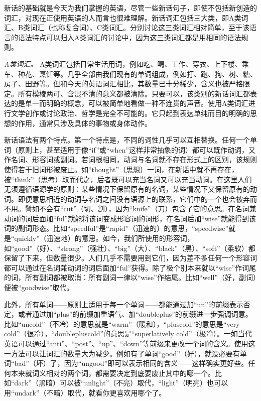 新话的基础就是今天为我们掌握的英语，尽管一些新话句子，即使不包括新创造的词汇，对现在正使用英语的人而言也很难理解。新话词汇包括三大类，即A类词汇、B类词汇（也称复合词）、C类词汇。分别讨论这三类词汇相对简单，至于该语言的语法特点可以归入A类词汇的讨论中，因为这三类词汇都是用相同的语法规则。

\sectionbreak

\emph{A类词汇。} A类词汇包括日常生活用词，例如吃、喝、工作、穿衣、上下楼、乘车、种花、烹饪等。几乎全部由我们现有的单词组成，例如打、跑、狗、树、糖、房子、田野等。但和今天的英语词汇相比，其数量已十分稀少，含义也被严格限定。所有模棱两可、含混不清的意义都被清除。只要可以，该类别的新话词汇都表达的是单一而明确的概念，可以被简单地看做一种不连贯的声音。使用A类词汇进行文学创作或讨论政治、哲学是完全不可能的。它只起到表达单纯而目的明确的思想的作用，通常只涉及具体的事物或身体动作。

新话语法有两个特点。第一个特点是，不同的词性几乎可以互相替换。任何一个单词（原则上，甚至适用于像``if''或``when''这样非常抽象的词）都可以既作动词，又作名词、形容词或副词。若词根相同，动词与名词就不存在形式上的区别，该规则使得若干旧词形被废止。如``thought''（思想）一词，在新话中就不再存在，被``think''（思考）取而代之，后者既可以充当名词又可以充当动词。在这里人们无须遵循语源学的原则：某些情况下保留原有的名词，某些情况下又保留原有的动词。即便意思相近的动词与名词之间没有语源上的联系，它们中的一个也会被弃而不用。譬如不会有``cut''（切、割），因为``knife''（刀）包含了它的意思。在名词兼动词的词后面加``ful''就能将该词变成形容词的词形，在名词后加``wise''就能得到该词的副词形态。比如``speedful''是``rapid''（迅速的）的意思，``speedwise''就是``quickly''（迅速地）的意思。如今，我们所使用的形容词，如``good''（好）、``strong''（强壮）、``big''（大）、``black''（黑）、``soft''（柔软）都保留了下来，但数量很少。人们几乎不需要用到它们，因为差不多任何一个形容词都可以通过在名词兼动词的词后面加``ful''获得。除了极个别本来就以``wise''作词尾的词，所有副词都被取消：所有副词一律以``wise''作结尾。比如``well''（好，副词）便被``goodwise''取代。

此外，所有单词——原则上适用于每一个单词——都能通过加``un''的前缀表示否定，或者通过加``plus''的前缀加重语气、加``doubleplus''的前缀进一步强调词意。比如``uncold''（不冷）的意思就是``warm''（暖和），``pluscold''的意思是``very
cold''（很冷），``doublepluscold''的意思是``superlatively
cold''（极冷）。一如当代英语可以通过``anti''、``post''、``up''、``down''等前缀来更改一个词的含义。使用这一方法可以让词汇的数量大为减少。例如有了单词``good''（好），就没必要有单词``bad''（坏）了，因为``ungood''即可以表示相同的含义——这样确实更好些。任何本来就词义相对的两个词，都需要决定到底要废止其中的哪一个。比如``dark''（黑暗）可以被``unlight''（不亮）取代，``light''（明亮）也可以用``undark''（不暗）取代，就看你更喜欢用哪个了。

